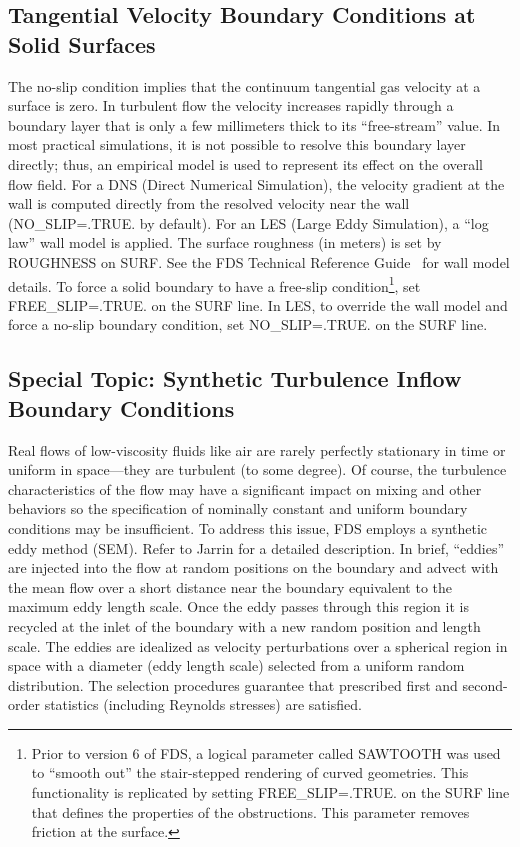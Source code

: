 \documentclass[11pt]{book}
\begin{document}
\subsection{Tangential Velocity Boundary Conditions at Solid Surfaces}
\label{info:WALL_MODEL}

The no-slip condition implies that the continuum tangential gas velocity at a surface is zero.
In turbulent flow the velocity increases rapidly through a boundary layer that is only a few millimeters thick to its ``free-stream'' value.
In most practical simulations, it is not possible to resolve this boundary layer directly; thus, an empirical model is used to represent its effect on the overall flow field. For a DNS (Direct Numerical Simulation), the velocity gradient at the wall is computed directly from the resolved velocity near the wall ({\ct NO\_SLIP=.TRUE.} by default). For an LES (Large Eddy Simulation), a ``log law'' wall model is applied. The surface roughness (in meters) is set by {\ct ROUGHNESS} on {\ct SURF}. See the FDS Technical Reference Guide~\cite{FDS_Math_Guide} for wall model details. To force a solid boundary to have a free-slip condition\footnote{Prior to version 6 of FDS, a logical parameter called {\ct SAWTOOTH} was used to ``smooth out'' the stair-stepped rendering of curved geometries. This functionality is replicated by setting {\ct FREE\_SLIP=.TRUE.} on the {\ct SURF} line that defines the properties of the obstructions. This parameter removes friction at the surface.}, set {\ct FREE\_SLIP=.TRUE.} on the {\ct SURF} line. In LES, to override the wall model and force a no-slip boundary condition, set {\ct NO\_SLIP=.TRUE.} on the {\ct SURF} line.


\subsection{Special Topic: Synthetic Turbulence Inflow Boundary Conditions}
\label{info:synthetic_turbulence}

Real flows of low-viscosity fluids like air are rarely perfectly stationary in time or uniform in space---they are turbulent (to some degree). Of course, the turbulence characteristics of the flow may have a significant impact on mixing and other behaviors so the specification of nominally constant and uniform boundary conditions may be insufficient.  To address this issue, FDS employs a synthetic eddy method (SEM).  Refer to Jarrin \cite{Jarrin:2008} for a detailed description. In brief, ``eddies'' are injected into the flow at random positions on the boundary and advect with the mean flow over a short distance near the boundary equivalent to the maximum eddy length scale.  Once the eddy passes through this region it is recycled at the inlet of the boundary with a new random position and length scale. The eddies are idealized as velocity perturbations over a spherical region in space with a diameter (eddy length scale) selected from a uniform random distribution. The selection procedures guarantee that prescribed first and second-order statistics (including Reynolds stresses) are satisfied.
\end{document}
